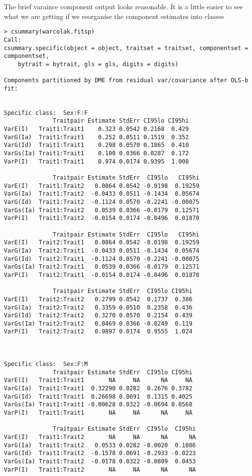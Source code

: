 \documentclass[titlepage]{article}  %
\begin{document}
The brief varaince component output looks reasonable. It is a little easier to see what we are getting if we reorganise the component estimates into classes
\begin{verbatim}
> csummary(warcolak.fitsp)
Call:
csummary.specific(object = object, traitset = traitset, componentset = componentset, 
    bytrait = bytrait, gls = gls, digits = digits)

Components partitioned by DME from residual var/covariance after OLS-b fit:


Specific class:  Sex:F:F 
              Traitpair Estimate StdErr CI95lo CI95hi
VarE(I)   Trait1:Trait1    0.323 0.0542 0.2168  0.429
VarG(Ia)  Trait1:Trait1    0.252 0.0511 0.1519  0.352
VarG(Id)  Trait1:Trait1    0.298 0.0570 0.1865  0.410
VarGs(Ia) Trait1:Trait1    0.100 0.0366 0.0287  0.172
VarP(I)   Trait1:Trait1    0.974 0.0174 0.9395  1.008

              Traitpair Estimate StdErr  CI95lo   CI95hi
VarE(I)   Trait1:Trait2   0.0864 0.0542 -0.0198  0.19259
VarG(Ia)  Trait1:Trait2  -0.0433 0.0511 -0.1434  0.05674
VarG(Id)  Trait1:Trait2  -0.1124 0.0570 -0.2241 -0.00075
VarGs(Ia) Trait1:Trait2   0.0539 0.0366 -0.0179  0.12571
VarP(I)   Trait1:Trait2  -0.0154 0.0174 -0.0496  0.01870

              Traitpair Estimate StdErr  CI95lo   CI95hi
VarE(I)   Trait2:Trait1   0.0864 0.0542 -0.0198  0.19259
VarG(Ia)  Trait2:Trait1  -0.0433 0.0511 -0.1434  0.05674
VarG(Id)  Trait2:Trait1  -0.1124 0.0570 -0.2241 -0.00075
VarGs(Ia) Trait2:Trait1   0.0539 0.0366 -0.0179  0.12571
VarP(I)   Trait2:Trait1  -0.0154 0.0174 -0.0496  0.01870

              Traitpair Estimate StdErr  CI95lo CI95hi
VarE(I)   Trait2:Trait2   0.2799 0.0542  0.1737  0.386
VarG(Ia)  Trait2:Trait2   0.3359 0.0510  0.2358  0.436
VarG(Id)  Trait2:Trait2   0.3270 0.0570  0.2154  0.439
VarGs(Ia) Trait2:Trait2   0.0469 0.0366 -0.0249  0.119
VarP(I)   Trait2:Trait2   0.9897 0.0174  0.9555  1.024



Specific class:  Sex:F:M 
              Traitpair Estimate StdErr  CI95lo CI95hi
VarE(I)   Trait1:Trait1       NA     NA      NA     NA
VarG(Ia)  Trait1:Trait1  0.32290 0.0282  0.2676 0.3782
VarG(Id)  Trait1:Trait1  0.26698 0.0691  0.1315 0.4025
VarGs(Ia) Trait1:Trait1 -0.00628 0.0322 -0.0694 0.0568
VarP(I)   Trait1:Trait1       NA     NA      NA     NA

              Traitpair Estimate StdErr  CI95lo  CI95hi
VarE(I)   Trait1:Trait2       NA     NA      NA      NA
VarG(Ia)  Trait1:Trait2   0.0533 0.0282 -0.0020  0.1086
VarG(Id)  Trait1:Trait2  -0.1578 0.0691 -0.2933 -0.0223
VarGs(Ia) Trait1:Trait2  -0.0178 0.0322 -0.0809  0.0453
VarP(I)   Trait1:Trait2       NA     NA      NA      NA


\end{verbatim}
\end{document}
